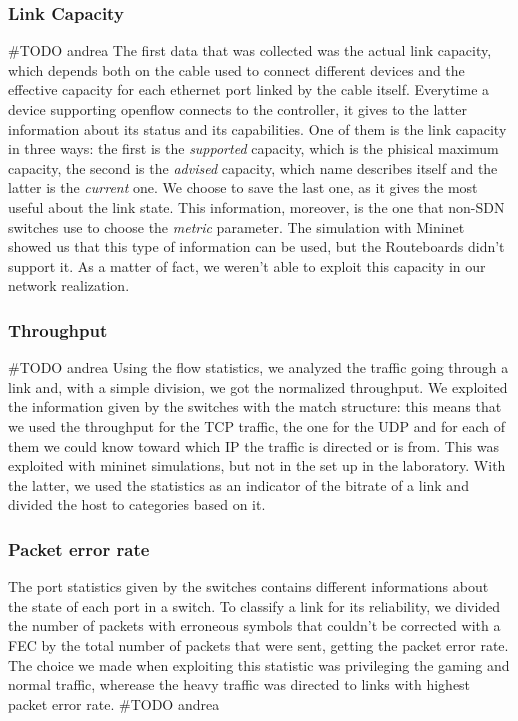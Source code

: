 \documentclass[conference,10pt]{IEEEtran}
\begin{document}
		\subsubsection{Link Capacity}
		\#TODO andrea
		The first data that was collected was the actual link capacity, which depends both on the cable used to connect
		different devices and the effective capacity for each ethernet port linked by the cable itself. Everytime a device supporting
		openflow connects to the controller, it gives to the latter information about its status and its capabilities. One of them is
		the link capacity in three ways: the first is the \textit{supported} capacity, which is the phisical maximum capacity, the second is the
		\textit{advised} capacity, which name describes itself and the latter is the \textit{current} one. We choose to save the last one,
		as it gives the most useful about the link state. This information, moreover, is the one that non-SDN switches use to choose the \textit{metric}
		parameter. The simulation with Mininet showed us that this type of information can be used, but the Routeboards didn't support it.
		As a matter of fact, we weren't able to exploit this capacity in our network realization.
    \subsubsection{Throughput}
    \#TODO andrea
		Using the flow statistics, we analyzed the traffic going through a link and, with a simple division, we got the normalized throughput.
		We exploited the information given by the switches with the match structure: this means that we used the throughput for the TCP traffic,
		the one for the UDP and for each of them we could know toward which IP the traffic is directed or is from. This was exploited with mininet
		simulations, but not in the set up in the laboratory. With the latter, we used the statistics as an indicator of the bitrate of a link
		and divided the host to categories based on it.

		\subsubsection{Packet error rate}
		The port statistics given by the switches contains different informations about the state of each port in a switch. To classify a link for its
		reliability, we divided the number of packets with erroneous symbols that couldn't be corrected with a FEC by the total number of packets that were sent,
		getting the packet error rate. The choice we made when exploiting this statistic was privileging the gaming and normal traffic, wherease the
		heavy traffic was directed to links with highest packet error rate.
		\#TODO andrea
\end{document}
